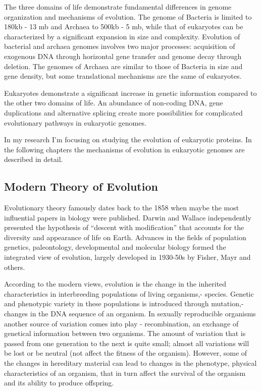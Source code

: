 \documentclass[11pt, a4paper,oneside]{report}
\begin{document}
The three domains of life demonstrate fundamental differences in genome organization and mechanisms of evolution. The genome of Bacteria is limited to 180kb - 13 mb and Archaea to 500kb - 5 mb\cite{Koonin2008}, while that of eukaryotes can be characterized by a significant expansion in size and complexity\cite{Gregory2007, Parfrey2008}. Evolution of bacterial and archaea genomes involves two major processes: acquisition of exogenous DNA through horizontal gene transfer and genome decay through deletion\cite{Pal2005}. The genomes of Archaea are similar to those of Bacteria in size and gene density, but some translational mechanisms are the same of eukaryotes.

 Eukaryotes demonstrate a significant increase in genetic information compared to the other two domains of life. An abundance of non-coding DNA, gene duplications and alternative splicing create more possibilities for complicated evolutionary pathways in eukaryotic genomes.
 
  In my research I'm focusing on studying the evolution of eukaryotic proteins. In the following chapters the mechanisms of evolution in eukaryotic genomes are described in detail.
  
\subsection{Modern Theory of Evolution}
Evolutionary theory famously dates back to the 1858 when maybe the most influential papers in biology were published. 
Darwin and Wallace independently presented the hypothesis of “descent with modification” that accounts for the diversity 
and appearance of life on Earth\cite{Wallace1912}. Advances in the fields of population genetics, paleontology, developmental and 
molecular biology formed the integrated view of evolution, largely developed in 1930-50s by Fisher, Mayr and others\cite{MAYR1963,Grant1980,Kutschera2004}. 

According to the modern views, evolution is the change in the inherited characteristics in interbreeding populations of 
living organisms,- species. Genetic and phenotypic variety in these populations is introduced through mutation,- changes in the DNA sequence of an organism. In sexually reproducible organisms another source of variation comes into play - recombination, an exchange of genetical information between two organisms. The amount of variation that is passed from one generation to the next is quite small; almost all variations will be lost or be neutral (not affect the fitness of the organism). However, some of the changes in hereditary material can lead to changes in the phenotype, physical characteristics of an organism, that in turn affect the survival of the organism and its ability to produce offspring. 
\end{document}
